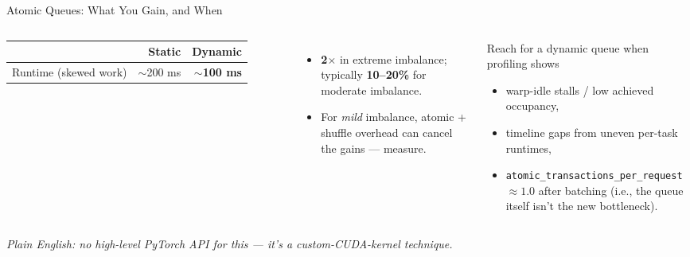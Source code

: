 \documentclass[aspectratio=169]{beamer}
\newcommand{\kw}[1]{\textbf{\textcolor{kwblue}{#1}}}
\newcommand{\pe}[1]{{\footnotesize\itshape Plain English: #1}}
\begin{document}
\begin{frame}{Atomic Queues: What You Gain, and When}
  \begin{columns}[c]
    {\small\setlength{\tabcolsep}{4pt}
    \begin{tabular}{@{}lrr@{}}
      \toprule
      & \textbf{Static} & \textbf{Dynamic} \\
      \midrule
      Runtime (skewed work) & $\sim$200 ms & \kw{$\sim$100 ms} \\
      \bottomrule
    \end{tabular}}\\[6pt]
    \begin{itemize}\small
      \item \kw{2$\times$} in extreme imbalance; typically \kw{10--20\%} for moderate imbalance.
      \item For \emph{mild} imbalance, atomic + shuffle overhead can cancel the gains --- measure.
    \end{itemize}
    \begin{block}{Reach for a dynamic queue when profiling shows}
      \begin{itemize}\small
        \item warp-idle stalls / low achieved occupancy,
        \item timeline gaps from uneven per-task runtimes,
        \item \texttt{atomic\_transactions\_per\_request} $\approx 1.0$ after batching
              (i.e., the queue itself isn't the new bottleneck).
      \end{itemize}
    \end{block}
  \end{columns}
  \medskip
  \pe{no high-level PyTorch API for this --- it's a custom-CUDA-kernel technique.}
\end{frame}
\end{document}
